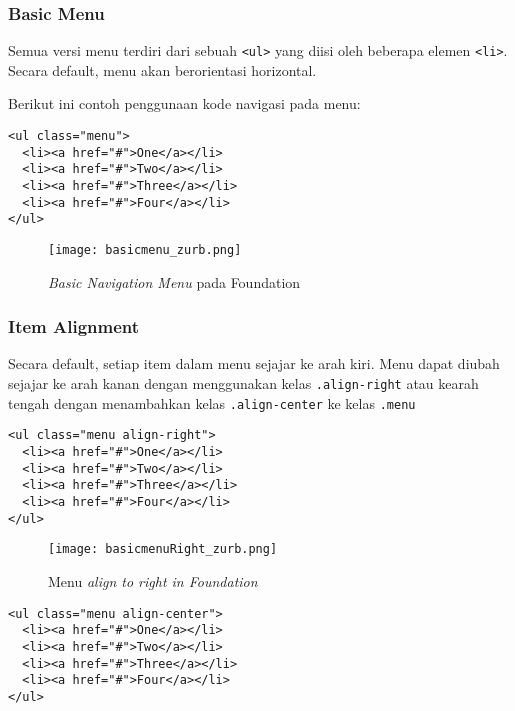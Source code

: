 \subsubsection{Basic Menu}
\label{sssec:navigation_1}

Semua versi menu terdiri dari sebuah \texttt{<ul>} yang diisi oleh beberapa elemen \texttt{<li>}. Secara default, menu akan berorientasi horizontal.\cite{zurbfoundation:17}

Berikut ini contoh penggunaan kode navigasi pada menu:

\begin{lstlisting}[frame=single] 
<ul class="menu">
  <li><a href="#">One</a></li>
  <li><a href="#">Two</a></li>
  <li><a href="#">Three</a></li>
  <li><a href="#">Four</a></li>
</ul>
\end{lstlisting}

\begin{figure} [H]  
    \centering  
	\texttt{[image: basicmenu\_zurb.png]}  
	\caption{\textit{Basic Navigation Menu} pada Foundation}
	\label{fig:gridbasic_zurb} 
\end{figure}

\subsubsection{Item Alignment}
\label{sssec:navigation_2}
Secara default, setiap item dalam menu sejajar ke arah kiri. Menu dapat diubah sejajar ke arah kanan dengan menggunakan kelas \texttt{.align-right} atau kearah tengah dengan menambahkan kelas \texttt{.align-center} ke kelas \texttt{.menu} \cite{zurbfoundation:17}
\begin{lstlisting}[frame=single] 
<ul class="menu align-right">
  <li><a href="#">One</a></li>
  <li><a href="#">Two</a></li>
  <li><a href="#">Three</a></li>
  <li><a href="#">Four</a></li>
</ul>
\end{lstlisting}

\begin{figure} [H]
	\centering  
	\texttt{[image: basicmenuRight\_zurb.png]}  
	\caption{Menu \textit{align to right in Foundation}}
	\label{fig:gridbasic_zurb} 
\end{figure}

\begin{lstlisting}[frame=single] 
<ul class="menu align-center">
  <li><a href="#">One</a></li>
  <li><a href="#">Two</a></li>
  <li><a href="#">Three</a></li>
  <li><a href="#">Four</a></li>
</ul>
\end{lstlisting}

